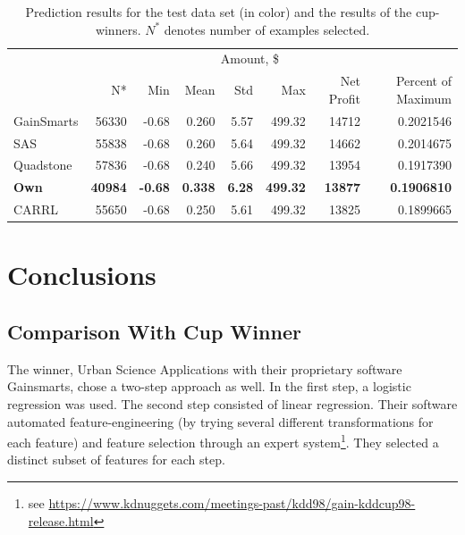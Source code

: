 \documentclass[
  11pt,
  a4paper,
  DIV=12,captions=tableheading,oneside,titlepage]{scrbook}
\begin{document}
\begin{table}[!h]

\caption{\label{tab:prediction-results}Prediction results for the test data set (in color) and the results of the cup-winners. \(N^*\) denotes number of examples selected.}
\centering
\begin{tabular}{lrrrrrrr}
\toprule
\multicolumn{1}{c}{ } & \multicolumn{1}{c}{ } & \multicolumn{5}{c}{Amount, \$} & \multicolumn{1}{c}{ } \\
\cmidrule(l{3pt}r{3pt}){3-7}
  & N* & Min & Mean & Std & Max & Net Profit & Percent of Maximum\\
\midrule
GainSmarts & 56330 & -0.68 & 0.260 & 5.57 & 499.32 & 14712 & 0.2021546\\
SAS & 55838 & -0.68 & 0.260 & 5.64 & 499.32 & 14662 & 0.2014675\\
Quadstone & 57836 & -0.68 & 0.240 & 5.66 & 499.32 & 13954 & 0.1917390\\
\textcolor[HTML]{39a8d1}{\textbf{Own}} & \textcolor[HTML]{39a8d1}{\textbf{40984}} & \textcolor[HTML]{39a8d1}{\textbf{-0.68}} & \textcolor[HTML]{39a8d1}{\textbf{0.338}} & \textcolor[HTML]{39a8d1}{\textbf{6.28}} & \textcolor[HTML]{39a8d1}{\textbf{499.32}} & \textcolor[HTML]{39a8d1}{\textbf{13877}} & \textcolor[HTML]{39a8d1}{\textbf{0.1906810}}\\
CARRL & 55650 & -0.68 & 0.250 & 5.61 & 499.32 & 13825 & 0.1899665\\
\bottomrule
\end{tabular}
\end{table}

\hypertarget{conclusions}{%
\chapter{Conclusions}\label{conclusions}}

\hypertarget{comparison-with-cup-winner}{%
\section{Comparison With Cup Winner}\label{comparison-with-cup-winner}}

The winner, Urban Science Applications with their proprietary software Gainsmarts, chose a two-step approach as well. In the first step, a logistic regression was used. The second step consisted of linear regression. Their software automated feature-engineering (by trying several different transformations for each feature) and feature selection through an expert system\footnote{see \url{https://www.kdnuggets.com/meetings-past/kdd98/gain-kddcup98-release.html}}. They selected a distinct subset of features for each step.
\end{document}
